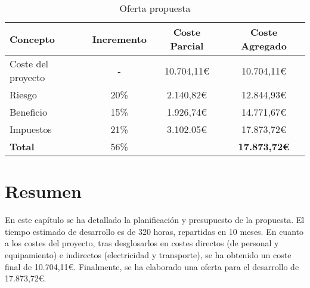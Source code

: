\begin{table}[H]
    \begin{tabular}{@{}lccc@{}}
        \toprule
        \textbf{Concepto} & \textbf{Incremento} & \textbf{Coste Parcial} & \textbf{Coste} \textbf{Agregado}\\
        \midrule
        Coste del proyecto & -    & 10.704,11\euro & 10.704,11\euro \\
        Riesgo             & 20\% &  2.140,82\euro & 12.844,93\euro \\
        Beneficio          & 15\% &  1.926,74\euro & 14.771,67\euro \\
        Impuestos          & 21\% &  3.102.05\euro & 17.873,72\euro\\
        \midrule
        \textbf{Total}     & 56\% &        & \textbf{17.873,72\euro}\\
        \bottomrule
    \end{tabular}
    \caption{Oferta propuesta}\label{tab:offer}
\end{table}

\section{Resumen}

En este capítulo se ha detallado la planificación y presupuesto de la propuesta. El tiempo estimado de desarrollo es de 320 horas, repartidas en 10 meses. En cuanto a los costes del proyecto, tras desglosarlos en costes directos (de personal y equipamiento) e indirectos (electricidad y transporte), se ha obtenido un coste final de 10.704,11\euro. Finalmente, se ha elaborado una oferta para el desarrollo de 17.873,72\euro.
